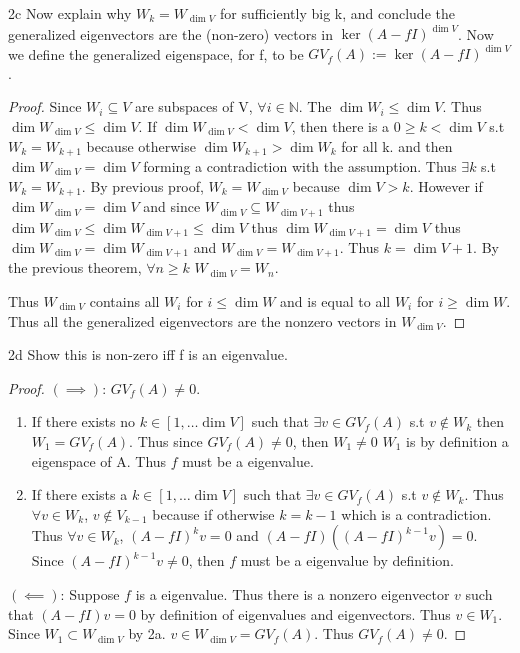 \documentclass{article}
\newcommand{\N}{\mathbb{N}}
\begin{document}
\begin{PROB}{2c}\label{Problem 2c.}
    Now explain why $W_k = W_{\dim V}$ for sufficiently big k, and conclude the generalized eigenvectors are the (non-zero) vectors in $\ker (A - fI)^{\dim V}$. Now we define the generalized eigenspace, for f, to be $GV_f(A) := \ker (A - fI)^{\dim V}$. 
\end{PROB}
\begin{proof}
    Since $W_i \subseteq V$ are subspaces of V, $\forall i \in \N$. The $\dim W_i \leq \dim V$. Thus $\dim W_{\dim V} \leq \dim V$. If $\dim W_{\dim V} < \dim V$, then there is a $0 \geq k < \dim V$ s.t $W_{k} = W_{k + 1}$ because otherwise $\dim W_{k + 1} > \dim W_{k}$ for all k. and then $\dim W_{\dim V} = \dim V$ forming a contradiction with the assumption. Thus $\exists k$ s.t $W_k = W_{k+1}$. By previous proof, $W_k = W_{\dim V}$ because $\dim V > k$. However if $\dim W_{\dim V} = \dim V$ and since $W_{\dim V} \subseteq W_{\dim V+1}$ thus $\dim W_{\dim V} \leq \dim W_{\dim V + 1} \leq \dim V$ thus $\dim W_{\dim V + 1} = \dim V$ thus $\dim W_{\dim V} = \dim W_{\dim V + 1}$ and $W_{\dim V} = W_{\dim V + 1}$. Thus $k = \dim V + 1$. By the previous theorem, $\forall n \geq k$ $W_{\dim V} = W_{n}$.

    Thus $W_{\dim V}$ contains all $W_i$ for $i \leq \dim W$ and is equal to all $W_i$ for $i \geq \dim W$. Thus all the generalized eigenvectors are the nonzero vectors in $W_{\dim V}$. 
\end{proof}

\begin{PROB}{2d}\label{Problem 2d.}
    Show this is non-zero iff f is an eigenvalue. 
\end{PROB}
\begin{proof}
    $(\implies)$: $GV_f(A) \neq 0$. 

    \begin{enumerate}{}
        \item If there exists no $k \in [1, \ldots \dim V]$ such that $\exists v \in GV_f(A)$ s.t $v \not \in W_k$ then $W_1 = GV_f(A)$. Thus since $GV_f(A) \neq 0$, then $W_1 \neq 0$ $W_1$ is by definition a eigenspace of A. Thus $f$ must be a eigenvalue.
        \item If there exists a $k \in [1, \ldots \dim V]$ such that $\exists v \in GV_f(A)$ s.t $v \not \in W_k$. Thus $\forall v \in W_k$, $v \not \in V_{k - 1}$ because if otherwise $k = k- 1$ which is a contradiction. Thus $\forall v \in W_k$, $(A - fI)^kv = 0$ and $(A - fI)((A - fI)^{k-1}v) = 0$. Since $(A - fI)^{k-1}v \neq 0$, then $f$ must be a eigenvalue by definition.
    \end{enumerate}
    
    $(\impliedby)$: Suppose $f$ is a eigenvalue. Thus there is a nonzero eigenvector $v$ such that $(A - fI)v = 0$ by definition of eigenvalues and eigenvectors. Thus $v \in W_1$. Since $W_1 \subset W_{\dim V}$ by 2a. $v \in W_{\dim V} = GV_f(A)$. Thus $GV_f(A) \neq 0$. 
\end{proof}
\end{document}
